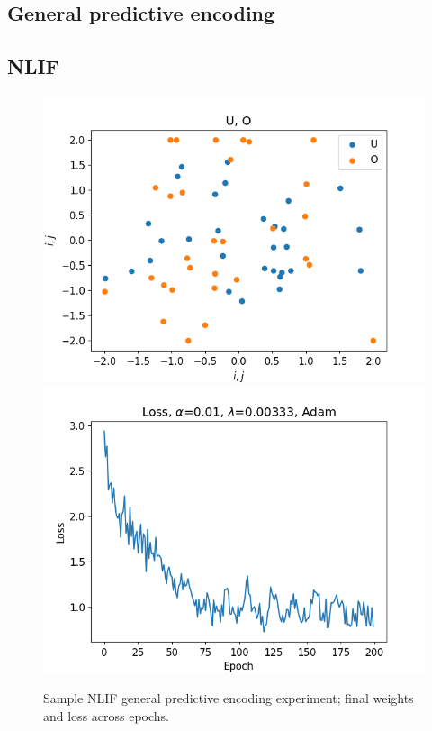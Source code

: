 \documentclass[mphil,deptreport,ianc]{infthesis} %
\begin{document}
\FloatBarrier

\subsection*{General predictive encoding}

\subsection*{NLIF}

\begin{figure}[!h]
    \centering
    \includegraphics[width=0.49\columnwidth]{figures/Supplementary/gating/NLIF/General/01-04_16-42-32-911/_weights_O_U.png}
    \includegraphics[width=0.49\columnwidth]{figures/Supplementary/gating/NLIF/General/01-04_16-42-32-911/plot_loss_test_mt_NLIF_et_GeneralPredictiveEncoding_N_30_titers_200.png}
    \caption{Sample NLIF general predictive encoding experiment; final weights and loss across epochs.}
    \label{fig:NLIF_GPE_1_w_loss}
\end{figure}
\end{document}
